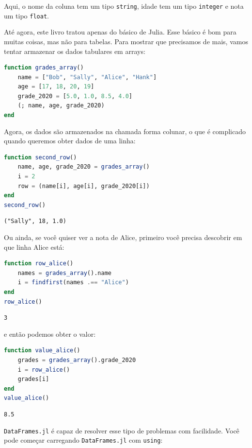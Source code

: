 \documentclass[
  notoc %
]{tufte-book}
\newcommand{\passthrough}[1]{#1}
\begin{document}
Aqui, o nome da coluna tem um tipo \passthrough{\lstinline!string!},
idade tem um tipo \passthrough{\lstinline!integer!} e nota um tipo
\passthrough{\lstinline!float!}.

Até agora, este livro tratou apenas do básico de Julia. Esse básico é
bom para muitas coisas, mas não para tabelas. Para mostrar que
precisamos de mais, vamos tentar armazenar os dados tabulares em arrays:

\begin{lstlisting}[language=Julia]
function grades_array()
    name = ["Bob", "Sally", "Alice", "Hank"]
    age = [17, 18, 20, 19]
    grade_2020 = [5.0, 1.0, 8.5, 4.0]
    (; name, age, grade_2020)
end
\end{lstlisting}

Agora, os dados são armazenados na chamada forma colunar, o que é
complicado quando queremos obter dados de uma linha:

\begin{lstlisting}[language=Julia]
function second_row()
    name, age, grade_2020 = grades_array()
    i = 2
    row = (name[i], age[i], grade_2020[i])
end
second_row()
\end{lstlisting}

\begin{lstlisting}[language=Output]
("Sally", 18, 1.0)
\end{lstlisting}

Ou ainda, se você quiser ver a nota de Alice, primeiro você precisa
descobrir em que linha Alice está:

\begin{lstlisting}[language=Julia]
function row_alice()
    names = grades_array().name
    i = findfirst(names .== "Alice")
end
row_alice()
\end{lstlisting}

\begin{lstlisting}[language=Output]
3
\end{lstlisting}

e então podemos obter o valor:

\begin{lstlisting}[language=Julia]
function value_alice()
    grades = grades_array().grade_2020
    i = row_alice()
    grades[i]
end
value_alice()
\end{lstlisting}

\begin{lstlisting}[language=Output]
8.5
\end{lstlisting}

\passthrough{\lstinline!DataFrames.jl!} é capaz de resolver esse tipo de
problemas com facilidade. Você pode começar carregando
\passthrough{\lstinline!DataFrames.jl!} com
\passthrough{\lstinline!using!}:
\end{document}
